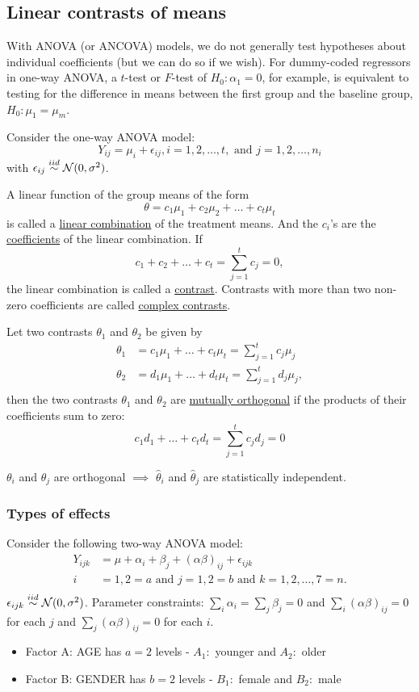 \subsection*{Linear contrasts of means}
With ANOVA (or ANCOVA) models, we do not generally test hypotheses about individual coefficients (but we can do so if we wish).
For dummy-coded regressors in one-way ANOVA, a $t$-test or $F$-test of $H_0: \alpha_1 = 0$, for example, is equivalent to testing for the difference in means between the first group and the baseline group, $H_0: \mu_1 = \mu_m$.

Consider the one-way ANOVA model:
$$
Y_{ij} = \mu_i + \epsilon_{ij}, i = 1, 2, \dots, t, \mbox{ and } j = 1, 2, \dots, n_i
$$
with $\epsilon_{ij} \overset{iid}{\sim} \mathcal{N}(0, \sigma^2)$.

A linear function of the group means of the form
$$
\theta = c_1 \mu_1 + c_2 \mu_2 + \dots + c_t \mu_t
$$
is called a \underline{linear combination} of the treatment means.
And the $c_i$'s are the \underline{coefficients} of the linear combination.
If
$$
c_1 + c_2 + \dots + c_t = \sum\limits_{j = 1}^t c_j = 0,
$$
the linear combination is called a \underline{contrast}.
Contrasts with more than two non-zero coefficients are called \underline{complex contrasts}.

Let two contrasts $\theta_1$ and $\theta_2$ be given by
$$
\begin{aligned}
	\theta_1 &= c_1 \mu_1 + \dots + c_t \mu_t = \sum\limits_{j = 1}^t c_j \mu_j\\
	\theta_2 &= d_1 \mu_1 + \dots + d_t \mu_t = \sum\limits_{j = 1}^t d_j \mu_j,\\	
\end{aligned}
$$
then the two contrasts $\theta_1$ and $\theta_2$ are \underline{mutually orthogonal} if the products of their coefficients sum to zero:
$$
c_1 d_1 + \dots + c_t d_t = \sum\limits_{j=1}^t c_j d_j = 0
$$

$\theta_i$ and $\theta_j$ are orthogonal $\implies$ $\hat{\theta}_i$ and $\hat{\theta}_j$ are statistically independent.

\subsubsection*{Types of effects}
Consider the following two-way ANOVA model:
$$
\begin{aligned}
Y_{ijk} &= \mu + \alpha_i + \beta_j + (\alpha \beta)_{ij} + \epsilon_{ijk}\\
i &= 1, 2 = a \mbox{ and } j = 1, 2=b \mbox{ and } k = 1, 2, \dots , 7 = n.\\
\end{aligned}
$$
$\epsilon_{ijk} \overset{iid}{\sim} \mathcal{N}(0, \sigma^2)$.  Parameter constraints: $\sum_i \alpha_i = \sum_j \beta_j = 0$ and 
$\sum_i (\alpha \beta)_{ij} = 0$ for each $j$ and $\sum_j (\alpha \beta)_{ij} = 0$ for each $i$.
\begin{itemize}
	\item Factor A: AGE has $a = 2$ levels - $A_1: $ younger and $A_2: $ older
	\item Factor B: GENDER has $b = 2$ levels - $B_1: $ female and $B_2: $ male
\end{itemize}

